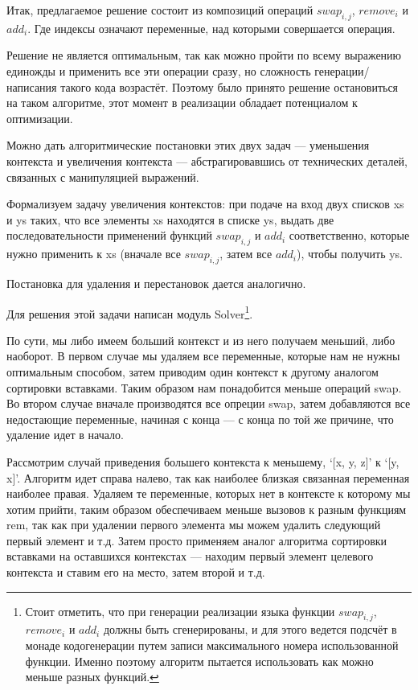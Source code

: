 Итак, предлагаемое решение состоит из композиций операций $swap_{i,j}$, $remove_i$ и $add_i$. Где индексы означают переменные, над которыми совершается операция.

Решение не является оптимальным, так как можно пройти по всему выражению единожды и применить все эти операции сразу, но сложность генерации/написания такого кода возрастёт. Поэтому было принято решение остановиться на таком алгоритме, этот момент в реализации обладает потенциалом к оптимизации.

\hfill

Можно дать алгоритмические постановки этих двух задач --- уменьшения контекста и увеличения контекста --- абстрагировавшись от технических деталей, связанных с манипуляцией выражений.

Формализуем задачу увеличения контекстов: при подаче на вход двух списков xs и ys таких, что все элементы xs находятся в списке ys, выдать две последовательности применений функций $swap_{i,j}$ и $add_i$ соответственно, которые нужно применить к xs (вначале все $swap_{i,j}$, затем все $add_i$), чтобы получить ys.

Постановка для удаления и перестановок дается аналогично.

Для решения этой задачи написан модуль Solver\footnote{Стоит отметить, что при генерации реализации языка функции $swap_{i,j}$, $remove_i$ и $add_i$ должны быть сгенерированы, и для этого ведется подсчёт в монаде кодогенерации путем записи максимального номера использованной функции. Именно поэтому алгоритм пытается использовать как можно меньше разных функций.}.

По сути, мы либо имеем больший контекст и из него получаем меньший, либо наоборот. В первом случае мы удаляем все переменные, которые нам не нужны оптимальным способом, затем приводим один контекст к другому аналогом сортировки вставками. Таким образом нам понадобится меньше операций swap. Во втором случае вначале производятся все опреции swap, затем добавляются все недостающие переменные, начиная с конца --- с конца по той же причине, что удаление идет в начало.

Рассмотрим случай приведения большего контекста к меньшему, `[x, y, z]' к `[y, x]'. Алгоритм идет справа налево, так как наиболее близкая связанная переменная наиболее правая. Удаляем те переменные, которых нет в контексте к которому мы хотим прийти, таким образом обеспечиваем меньше вызовов к разным функциям rem, так как при удалении первого элемента мы можем удалить следующий первый элемент и т.д. Затем просто применяем аналог алгоритма сортировки вставками на оставшихся контекстах --- находим первый элемент целевого контекста и ставим его на место, затем второй и т.д.

